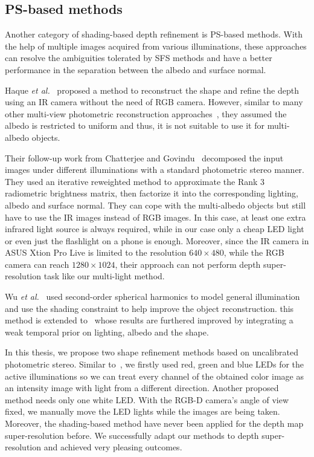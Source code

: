 \subsection{PS-based methods}
Another category of shading-based depth refinement is PS-based methods.
With the help of multiple images acquired from various illuminations, these approaches can resolve the ambiguities tolerated by SFS methods and have a better performance in the separation between the albedo and surface normal.

Haque \emph{et al.}~\cite{haque2014high} proposed a method to reconstruct the shape and refine the depth using an IR camera without the need of RGB camera.
However, similar to many other multi-view photometric reconstruction approaches~\cite{park2013multiview, queau2017dense}, they assumed the albedo is restricted to uniform and thus, it is not suitable to use it for multi-albedo objects.

Their follow-up work from Chatterjee and Govindu~\cite{chatterjee2015photometric} decomposed the input images under different illuminations with a standard photometric stereo manner.
They used an iterative reweighted method to approximate the Rank 3 radiometric brightness matrix, then factorize it into the corresponding lighting, albedo and surface normal. 
They can cope with the multi-albedo objects but still have to use the IR images instead of RGB images. 
In this case, at least one extra infrared light source is always required, while in our case only a cheap LED light or even just the flashlight on a phone is enough.
Moreover, since the IR camera in ASUS Xtion Pro Live is limited to the resolution $640\times 480$, while the RGB camera can reach $1280\times 1024$, their approach can not perform depth super-resolution task like our multi-light method.

Wu \emph{et al.}~\cite{wu2011high} used second-order spherical harmonics to model general illumination and use the shading constraint to help improve the object reconstruction.
this method is extended to~\cite{wu2011shading} whose results are furthered improved by integrating a weak temporal prior on lighting, albedo and the shape.


In this thesis, we propose two shape refinement methods based on uncalibrated photometric stereo.
Similar to~\cite{hernandez2011overcoming}, we firstly used  red, green and blue LEDs for the active illuminations so we can treat  every channel of the obtained color image as an intensity image with light from a different direction.
Another proposed method needs only one white LED. 
With the RGB-D camera's angle of view fixed, we manually move the LED lights while the images are being taken.
Moreover, the shading-based method have never been applied for the depth map super-resolution before.
We successfully adapt our methods to depth super-resolution and achieved very pleasing outcomes. 
